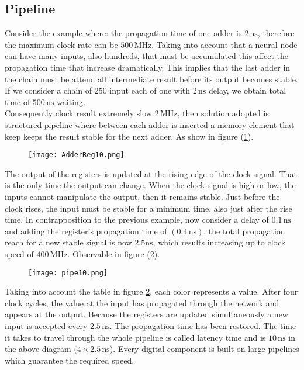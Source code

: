\subsection{Pipeline}
\label{ssec:hard-pipeline}
Consider the example where: the propagation time of one adder is $2 \,
\si{\nano\second}$, therefore the maximum clock rate can be $500
\,\si{\mega\hertz}$. Taking into account that a neural node can have many
inputs, also hundreds, that must be accumulated this affect the propagation time
that increase dramatically. This implies that the last adder in the chain must
be attend all intermediate result before its output becomes stable.
If we consider a chain of 250 input each of one with $2\, \si{\nano\second}$
delay, we obtain total time of $500 \,\si{\nano\second}$ waiting. \\
Consequently clock result extremely slow $2\,\si{\mega\hertz}$, then solution adopted
is structured pipeline where between each adder is inserted a memory element
that keep keeps the result stable for the next adder. 
As show in figure (\ref{fig:4-bit-adder-register}). \hfill \break
%
\begin{figure}[!h]
	\centering
    \texttt{[image: AdderReg10.png]}
    \label{fig:4-bit-adder-register}
\end{figure}
%
\break The output of the registers is updated at the rising edge of the clock signal.
That is the only time the output can change. When the clock signal is high or
low, the inputs cannot manipulate the output, then it remains stable.  
Just before the clock rises, the input must be stable for a minimum time, also just after the rise time. 
In contrapposition to the previous example, now consider a delay of $0.1 \,\si{\nano\second}$ and adding the register's propagation time of $(0.4 \,\si{\nano\second})$, the total propagation reach for a
new stable signal is now $2.5 \si{\nano\second}$, which results increasing up to clock speed of $400 \,\si{\mega\hertz}$. Observable in figure (\ref{fig:pipe}).
%
\begin{figure}[htb]
	\centering
	\texttt{[image: pipe10.png]}
	\label{fig:pipe}
\end{figure}
%
%
Taking into account the table in figure \ref{fig:pipe}, each color represents a value. 
After four clock cycles, the value at the input has propagated through the network and appears at the output.  
Because the registers are updated simultaneously a new input is accepted every
$2.5 \,\si{\nano\second}$.  
The propagation time has been restored. 
The time it takes to travel through the whole pipeline is called latency time
and is $10 \,\si{\nano\second}$ in the above diagram $(4 \times 2.5
\,\si{\nano\second}$). 
Every digital component is built on large pipelines which guarantee the required
speed.\cite{TPU:explained}   
%
